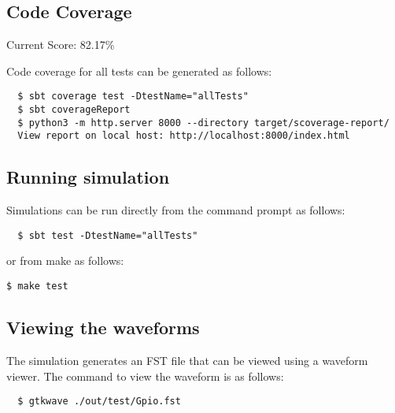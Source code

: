 \subsection{Code Coverage}
Current Score: 82.17\%

Code coverage for all tests can be generated as follows:
\begin{verbatim}
  $ sbt coverage test -DtestName="allTests"
  $ sbt coverageReport
  $ python3 -m http.server 8000 --directory target/scoverage-report/
  View report on local host: http://localhost:8000/index.html
\end{verbatim}

\subsection{Running simulation}

Simulations can be run directly from the command prompt as follows:

\begin{verbatim}
  $ sbt test -DtestName="allTests"
\end{verbatim}

or from make as follows:

\texttt{\$ make test}

\subsection{Viewing the waveforms}

The simulation generates an FST file that can be viewed using a waveform viewer. The command to view the waveform is as follows:
\begin{verbatim}
  $ gtkwave ./out/test/Gpio.fst
\end{verbatim}
